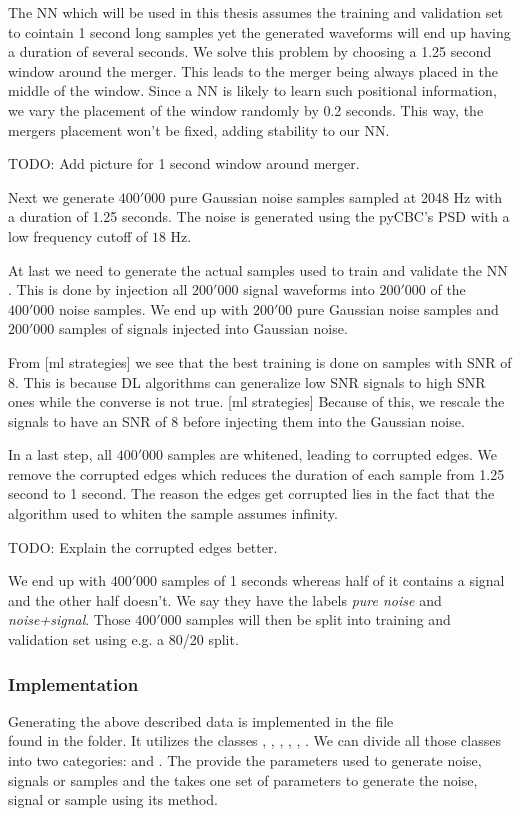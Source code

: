 The NN which will be used in this thesis assumes the training and validation set
to cointain 1 second long samples yet the generated waveforms will end up having 
a duration of several seconds. We solve this problem by choosing a 1.25 second
window around the merger. This leads to the merger being always placed in
the middle of the window. Since a NN is likely to learn such positional
information, we vary the placement of the window randomly by 0.2
seconds. This way, the mergers placement won't be fixed, adding stability to our
NN.


TODO: Add picture for 1 second window around merger.

Next we generate $400'000$ pure Gaussian noise samples sampled at 2048 Hz with
a duration of 1.25 seconds.
The noise is generated using the pyCBC's 
PSD with a low frequency cutoff of $18$ Hz.

At last we need to generate the actual samples used to train and validate the NN
. This is done by injection all $200'000$ signal waveforms into $200'000$ of the
$400'000$ noise samples. We end up with $200'00$ pure Gaussian noise samples
and $200'000$ samples of signals injected into Gaussian noise.

From [ml strategies] we see that the best training is done on samples with SNR
of 8. This is because DL algorithms can generalize low SNR signals to high SNR
ones while the converse is not true. [ml strategies] Because of this, we rescale
the signals to have an SNR of 8 before injecting them into the Gaussian noise.

In a last step, all $400'000$ samples are whitened, leading to corrupted edges.
We remove the corrupted edges which reduces the duration of each sample from
1.25 second to 1 second. The reason the edges get corrupted lies in the fact
that the algorithm used to whiten the sample assumes infinity.

TODO: Explain the corrupted edges better.

We end up with $400'000$ samples of 1 seconds whereas half of it contains a signal
and the other half doesn't. We say they have the labels \textit{pure noise} and 
\textit{noise+signal}. Those $400'000$ samples will then be split into
training and validation set using e.g. a 80/20 split.

\subsubsection{Implementation}
Generating the above described data is implemented in the file \\
 found in the  folder. It utilizes
the classes , , ,
, , . We can divide
all those classes into two categories:  and . The
 provide the parameters used to generate noise, signals or samples
and the  takes one set of parameters to generate the noise,
signal or sample using its  method.

